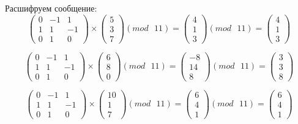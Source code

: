 \documentclass[a5paper, 10pt]{article}
\theoremstyle{definition}
\theoremstyle{plain}
\theoremstyle{remark}
\begin{document}
Расшифруем сообщение:
\begin{equation}
\begin{pmatrix}
 0 & -1 & 1 \\
1 & 1 & -1\\
0 & 1 & 0
\end{pmatrix}
 \times
\begin{pmatrix}
 5\\
3\\
7
\end{pmatrix}
(mod \text{ }11)
= 
\begin{pmatrix}
4\\
1\\
3
\end{pmatrix}
(mod \text{ }11)
= \begin{pmatrix}
4 \\
1\\
3
\end{pmatrix}
\end{equation}

\begin{equation}
\begin{pmatrix}
 0 & -1 & 1 \\
1 & 1 & -1\\
0 & 1 & 0
\end{pmatrix}
 \times
\begin{pmatrix}
6\\
8\\
0
\end{pmatrix}
(mod \text{ }11)
= 
\begin{pmatrix}
-8\\
14\\
8
\end{pmatrix}
(mod \text{ }11)
= \begin{pmatrix}
3 \\
3\\
8
\end{pmatrix}
\end{equation}

\begin{equation}
\begin{pmatrix}
 0 & -1 & 1 \\
1 & 1 & -1\\
0 & 1 & 0
\end{pmatrix}
 \times
\begin{pmatrix}
 10\\
1\\
7
\end{pmatrix}
(mod \text{ }11)
= 
\begin{pmatrix}
6\\
4\\
1
\end{pmatrix}
(mod \text{ }11)
= \begin{pmatrix}
6 \\
4\\
1
\end{pmatrix}
\end{equation}
\end{document}
